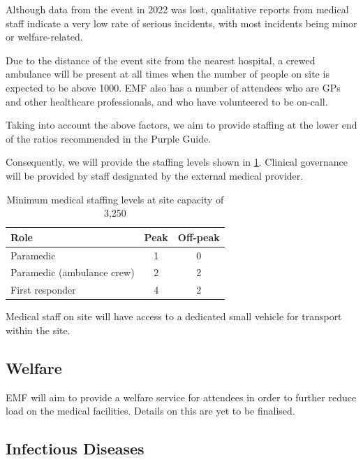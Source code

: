 Although data from the event in 2022 was lost, qualitative reports from medical staff indicate a very
low rate of serious incidents, with most incidents being minor or welfare-related.

Due to the distance of the event site from the nearest hospital, a crewed ambulance will be
present at all times when the number of people on site is expected to be above 1000. EMF also
has a number of attendees who are GPs and other healthcare professionals, and who have volunteered
to be on-call.

Taking into account the above factors, we aim to provide staffing at the lower end of the ratios
recommended in the Purple Guide.

Consequently, we will provide the staffing levels shown in \cref{table:medical-staffing}.
Clinical governance will be provided by staff designated by the external medical provider.

\begin{table}[h!]
    \caption{Minimum medical staffing levels at site capacity of 3,250}
    \label{table:medical-staffing}
    \centering
    \begin{tabular}{| l c c |}
        \hline
        \textbf{Role}              & \textbf{Peak} & \textbf{Off-peak} \\
        \hline
        Paramedic                  & 1             & 0                 \\
        Paramedic (ambulance crew) & 2             & 2                 \\
        First responder            & 4             & 2                 \\
        \hline
    \end{tabular}
\end{table}

Medical staff on site will have access to a dedicated small vehicle for transport within the site.

\subsection{Welfare}

EMF will aim to provide a welfare service for attendees in order to further reduce load on the medical
facilities. Details on this are yet to be finalised.

\pagebreak
\subsection{Infectious Diseases}

